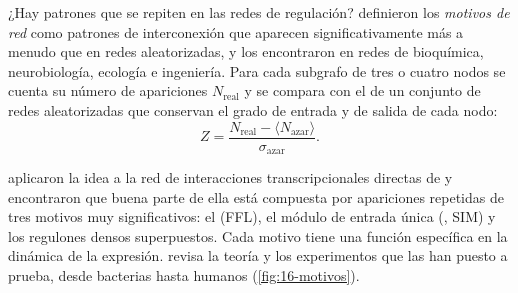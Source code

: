 ¿Hay patrones que se repiten en las redes de regulación? \textcite{c16-milo2002} definieron los \emph{motivos de red} como patrones de interconexión que aparecen significativamente más a menudo que en redes aleatorizadas, y los encontraron en redes de bioquímica, neurobiología, ecología e ingeniería. Para cada subgrafo de tres o cuatro nodos se cuenta su número de apariciones $N_{\text{real}}$ y se compara con el de un conjunto de redes aleatorizadas que conservan el grado de entrada y de salida de cada nodo:
\begin{equation}\label{eq:16-zscore}
Z=\frac{N_{\text{real}}-\langle N_{\text{azar}}\rangle}{\sigma_{\text{azar}}}.
\end{equation}
\begin{simbolos}
\end{simbolos}
\textcite{c16-shenorr2002} aplicaron la idea a la red de interacciones transcripcionales directas de  y encontraron que buena parte de ella está compuesta por apariciones repetidas de tres motivos muy significativos: el  (FFL), el módulo de entrada única (, SIM) y los regulones densos superpuestos. Cada motivo tiene una función específica en la dinámica de la expresión. \textcite{c16-alon2007} revisa la teoría y los experimentos que las han puesto a prueba, desde bacterias hasta humanos (\cref{fig:16-motivos}).

